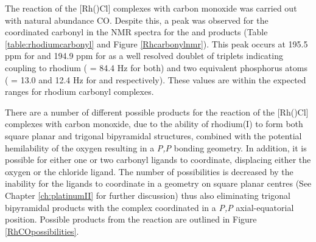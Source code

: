 The reaction of the [Rh(\tBuxantphos)Cl] complexes with carbon monoxide was carried out with natural abundance CO.  Despite this, a peak was observed for the coordinated carbonyl in the \carbon{} NMR spectra for the \tBusixantphos{} and \tBuxantphos{} products (Table \ref{table:rhodiumcarbonyl} and Figure \ref{Rhcarbonylnmr}).  This peak occurs at 195.5 ppm for \tBusixantphos{} and 194.9 ppm for \tBuxantphos{} as a well resolved doublet of triplets indicating coupling to rhodium (\JRhC{} = 84.4 Hz for both) and two equivalent phosphorus atoms (\JPC{} = 13.0 and 12.4 Hz for \tBusixantphos{} and \tBuxantphos{} respectively).  These values are within the expected ranges for rhodium carbonyl complexes.  



There are a number of different possible products for the reaction of the [Rh(\tBuxantphosk)Cl] complexes with carbon monoxide, due to the ability of rhodium(I) to form both square planar and trigonal bipyramidal structures, combined with the potential hemilability of the \tBuxantphos{} oxygen resulting in a \dento{}\emph{P,P}\textprime{} bonding geometry.  In addition, it is possible for either one or two carbonyl ligands to coordinate, displacing either the oxygen or the chloride ligand.  The number of possibilities is decreased by the inability for the \tBuxantphos{} ligands to coordinate in a \cis{} geometry on square planar centres (See Chapter \ref{ch:platinumII} for further discussion) thus also eliminating trigonal bipyramidal products with the \tBuxantphos{} complex coordinated in a \dento{}\emph{P,P}\textprime{} axial-equatorial position.  Possible products from the reaction are outlined in Figure \ref{RhCOpossibilities}.


